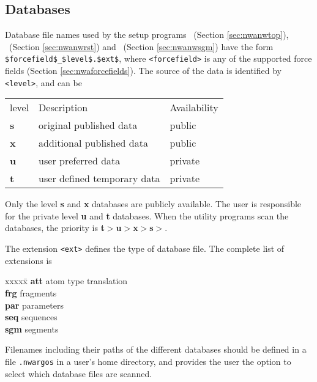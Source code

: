 \subsection{Databases}
Database file names used by the setup programs \nwtop\ (Section \ref{sec:nwanwtop}), 
\nwrst\ (Section \ref{sec:nwanwrst}) and \nwsgm\ (Section \ref{sec:nwanwsgm}) have the form
\verb+$forcefield$_$level$.$ext$+, where \verb+<forcefield>+ is any of the
supported force fields (Section \ref{sec:nwaforcefields}). The source of the data is 
identified by \verb+<level>+, and can be 
\begin{center}
\begin{tabular}{lll}
\hline
level   & Description                 & Availability \\
{\bf s} & original published data     & public       \\
{\bf x} & additional published data   & public       \\
{\bf u} & user preferred data         & private      \\
{\bf t} & user defined temporary data & private    \\
\hline
\end{tabular}
\end{center}

Only the level {\bf s} and {\bf x} databases are publicly available. 
The user is responsible for the private level {\bf u} and {\bf t}
databases. When the utility programs scan the databases, the priority
is {\bf t}$>${\bf u}$>${\bf x}$>${\bf s}$>$.

The extension \verb+<ext>+ defines the type of database file. The
complete list of extensions is
\begin{tabbing}
xxxxx\=\kill
{\bf att} \> atom type translation\\
{\bf frg} \> fragments\\
{\bf par} \> parameters\\
{\bf seq} \> sequences\\
{\bf sgm} \> segments\\
\end{tabbing} 

Filenames including their paths of the different databases should be 
defined in a file 
{\tt .nwargos} in a user's home directory, and provides the user the
option to select which database files are scanned.

